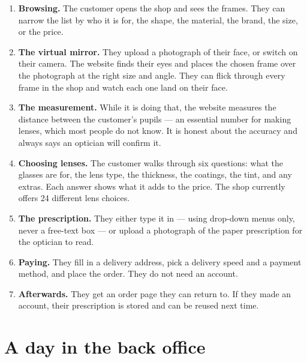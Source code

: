 \documentclass[11pt,a4paper]{report}
\begin{document}
\begin{enumerate}
  \item \textbf{Browsing.} The customer opens the shop and sees the frames.
        They can narrow the list by who it is for, the shape, the material,
        the brand, the size, or the price.

  \item \textbf{The virtual mirror.} They upload a photograph of their face,
        or switch on their camera. The website finds their eyes and places the
        chosen frame over the photograph at the right size and angle. They can
        flick through every frame in the shop and watch each one land on their
        face.

  \item \textbf{The measurement.} While it is doing that, the website
        measures the distance between the customer's pupils --- an essential
        number for making lenses, which most people do not know. It is honest
        about the accuracy and always says an optician will confirm it.

  \item \textbf{Choosing lenses.} The customer walks through six questions:
        what the glasses are for, the lens type, the thickness, the coatings,
        the tint, and any extras. Each answer shows what it adds to the price.
        The shop currently offers 24 different lens choices.

  \item \textbf{The prescription.} They either type it in --- using drop-down
        menus only, never a free-text box --- or upload a photograph of the
        paper prescription for the optician to read.

  \item \textbf{Paying.} They fill in a delivery address, pick a delivery
        speed and a payment method, and place the order. They do not need an
        account.

  \item \textbf{Afterwards.} They get an order page they can return to. If
        they made an account, their prescription is stored and can be reused
        next time.
\end{enumerate}

\section{A day in the back office}
\end{document}
